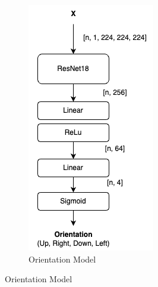 \begin{figure}[b]
    \centering
    \begin{subfigure}{0.4\linewidth}
        \centering
        \includegraphics[width=\linewidth]{images/OrientationModel.png}
        \caption{Orientation Model}
        \label{fig:orientation_model}

\end{subfigure}
\end{figure}
